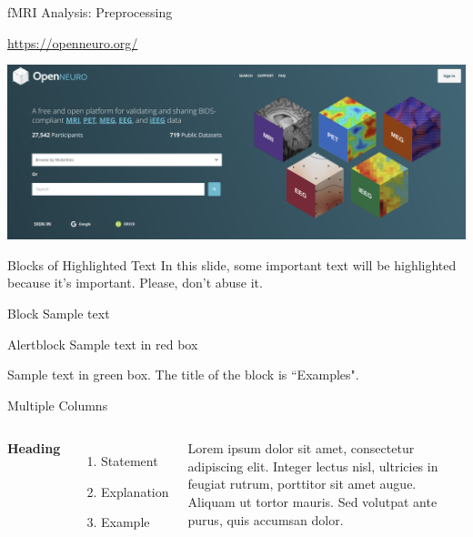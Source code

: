 \documentclass[aspectratio=169,xcolor=dvipsnames]{beamer}
\begin{document}

\begin{frame}{fMRI Analysis: Preprocessing}

\url{https://openneuro.org/}

\vspace{0.2cm}
\includegraphics[width=1\textwidth]{imgs/openneuro}

\end{frame}





\begin{frame}{Blocks of Highlighted Text}
    In this slide, some important text will be \alert{highlighted} because it's important. Please, don't abuse it.

    \begin{block}{Block}
        Sample text
    \end{block}

    \begin{alertblock}{Alertblock}
        Sample text in red box
    \end{alertblock}

    \begin{examples}
        Sample text in green box. The title of the block is ``Examples".
    \end{examples}
\end{frame}


\begin{frame}{Multiple Columns}
    \begin{columns}[c] %

        \textbf{Heading}
        \begin{enumerate}
            \item Statement
            \item Explanation
            \item Example
        \end{enumerate}

        Lorem ipsum dolor sit amet, consectetur adipiscing elit. Integer lectus nisl, ultricies in feugiat rutrum, porttitor sit amet augue. Aliquam ut tortor mauris. Sed volutpat ante purus, quis accumsan dolor.

    \end{columns}
\end{frame}
\end{document}
